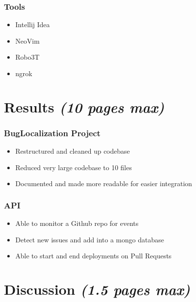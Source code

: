 \documentclass[12pt]{article}
\begin{document}
\subsubsection{Tools}\label{tools}

\begin{itemize}
\tightlist
\item
  Intellij Idea
\item
  NeoVim
\item
  Robo3T
\item
  ngrok
\end{itemize}

\section{\texorpdfstring{Results \emph{(10 pages
max)}}{Results (10 pages max)}}\label{results-10-pages-max}

\subsubsection{BugLocalization Project}\label{buglocalization-project}

\begin{itemize}
\tightlist
\item
  Restructured and cleaned up codebase
\item
  Reduced very large codebase to 10 files
\item
  Documented and made more readable for easier integration
\end{itemize}

\subsubsection{API}\label{api}

\begin{itemize}
\tightlist
\item
  Able to monitor a Github repo for events
\item
  Detect new issues and add into a mongo database
\item
  Able to start and end deployments on Pull Requests
\end{itemize}

\section{\texorpdfstring{Discussion \emph{(1.5 pages
max)}}{Discussion (1.5 pages max)}}\label{discussion-1.5-pages-max}
\end{document}
